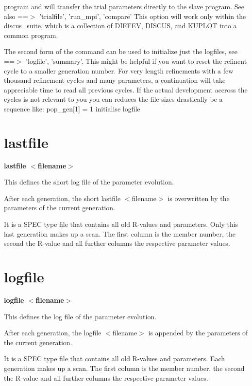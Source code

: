 program and will transfer the trial parameters directly to the 
slave program. See also ==$> $ 'trialfile', 'run\_mpi', 'compare' 
This option will work only within the discus\_suite, which is a 
collection of DIFFEV, DISCUS, and KUPLOT into a common program. 
\par
The second form of the command can be used to initialize just 
the logfiles, see ==$> $ 'logfile', 'summary'. 
This might be helpful if you want to reset the refinent cycle 
to a smaller generation number. For very length refinements with 
a few thousand refinement cycles and many parameters, a continuation 
will take appreciable time to read all previous cycles. If the 
actual development accross the cycles is not relevant to you you 
can reduces the file sizes drastically be a sequence like: 
pop\_gen[1] = 1 
initialise logfile 
\section{lastfile}
{\bf lastfile $ <$filename$> $ \par }
\par
\vspace{3pt}
This defines the short log file of the parameter evolution. 
\par
After each generation, the short lastfile $ <$filename$> $ is overwritten 
by the parameters of the current generation. 
\par
It is a SPEC type file that contains all old R-values and parameters. 
Only this last generation makes up a scan. The first column is the 
member number, the second the R-value and all further columns the 
respective parameter values. 
\section{logfile}
{\bf logfile $ <$filename$> $ \par }
\par
\vspace{3pt}
This defines the log file of the parameter evolution. 
\par
After each generation, the logfile $ <$filename$> $ is appended by the 
parameters of the current generation. 
\par
It is a SPEC type file that contains all old R-values and parameters. 
Each generation makes up a scan. The first column is the member number, 
the second the R-value and all further columns the respective parameter 
values. 
